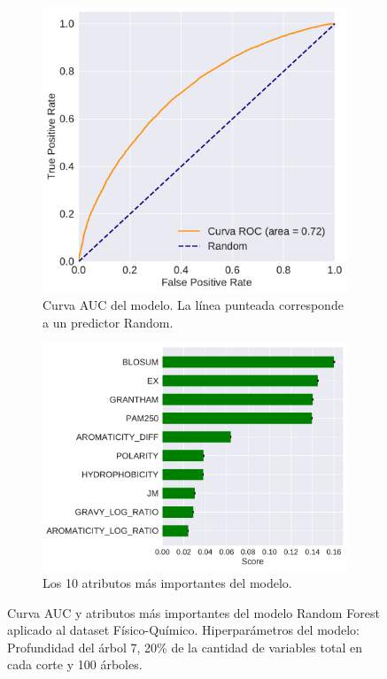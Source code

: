 \begin{figure}[H]
\centering
\begin{subfigure}[b]{0.7\textwidth}
    \centering
    \includegraphics[width=\textwidth]{documents/latex/figures/3/structural/auc_structural.pdf}
    \caption{Curva AUC del modelo. La línea punteada corresponde a un predictor Random.}
    \label{fig:auc_structural}
\end{subfigure}

\hfill
\hfill

\begin{subfigure}[b]{0.7\textwidth}
    \centering
    \includegraphics[width=\textwidth]{documents/latex/figures/3/structural/importances_structural.pdf}
    \caption{Los 10 atributos más importantes del modelo.}
    \label{fig:importances_structural}
\end{subfigure}

\caption{Curva AUC y atributos más importantes del modelo Random Forest aplicado al dataset Físico-Químico. Hiperparámetros del modelo: Profundidad del árbol 7, 20\% de la cantidad de variables total en cada corte y 100 árboles.}
\end{figure}


